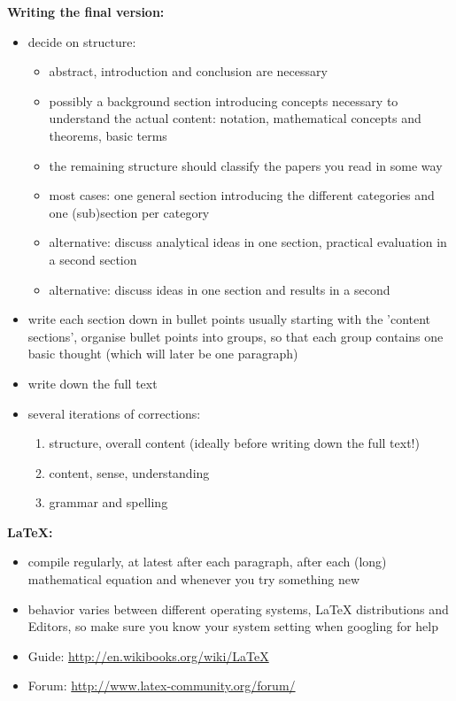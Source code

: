 \documentclass{article}
\begin{document}
\textbf{Writing the final version: }
\begin{itemize}
\item decide on structure: 
   \begin{itemize}
    \item abstract, introduction and conclusion are necessary
    \item possibly a background section introducing concepts necessary to understand the actual content: notation, mathematical concepts and theorems, basic terms
    \item the remaining structure should classify the papers you read in some way
    \item most cases: one general section introducing the different categories and one (sub)section per category
    \item alternative: discuss analytical ideas in one section, practical evaluation in a second section
    \item alternative: discuss ideas in one section and results in a second
   \end{itemize} 
\item write each section down in bullet points usually starting with the 'content sections', organise bullet points into groups, so that each group contains one basic thought (which will later be one paragraph)
\item write down the full text
\item several iterations of corrections:
\begin{enumerate}
\item structure, overall content (ideally before writing down the full text!)
\item content, sense, understanding
\item grammar and spelling
\end{enumerate}
\end{itemize}

\textbf{LaTeX:}
\begin{itemize}
\item compile regularly, at latest after each paragraph, after each (long) mathematical equation and whenever you try something new
\item behavior varies between different operating systems, LaTeX distributions and Editors, so make sure you know your system setting when googling for help
\item Guide: \url{http://en.wikibooks.org/wiki/LaTeX}
\item Forum: \url{http://www.latex-community.org/forum/}
\end{itemize}
\end{document}
